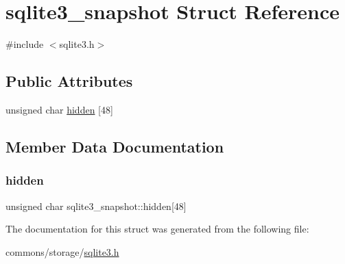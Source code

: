 \hypertarget{structsqlite3__snapshot}{}\section{sqlite3\+\_\+snapshot Struct Reference}
\label{structsqlite3__snapshot}


{\ttfamily \#include $<$sqlite3.\+h$>$}

\subsection*{Public Attributes}
\begin{DoxyCompactItemize}
\item 
unsigned char \mbox{\hyperlink{structsqlite3__snapshot_aeed328b50a9580e9a91d0bf10612be4e}{hidden}} \mbox{[}48\mbox{]}
\end{DoxyCompactItemize}


\subsection{Member Data Documentation}
\mbox{\label{structsqlite3__snapshot_aeed328b50a9580e9a91d0bf10612be4e}} 
\subsubsection{\texorpdfstring{hidden}{hidden}}
{\footnotesize\ttfamily unsigned char sqlite3\+\_\+snapshot\+::hidden\mbox{[}48\mbox{]}}



The documentation for this struct was generated from the following file\+:\begin{DoxyCompactItemize}
\item 
commons/storage/\mbox{\hyperlink{sqlite3_8h}{sqlite3.\+h}}\end{DoxyCompactItemize}
